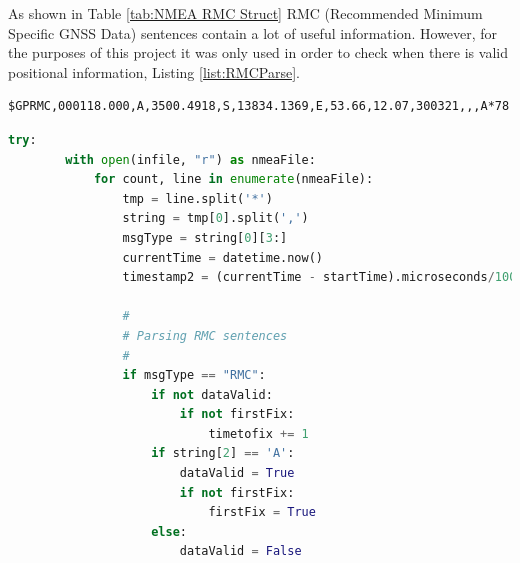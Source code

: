As shown in Table \ref{tab:NMEA RMC Struct} RMC (Recommended Minimum Specific GNSS Data) sentences contain a lot of useful information. However, for the purposes of this
project it was only used in order to check when there is valid positional information, Listing \ref{list:RMCParse}.

\begin{verbatim}
$GPRMC,000118.000,A,3500.4918,S,13834.1369,E,53.66,12.07,300321,,,A*78
\end{verbatim}

\begin{lstlisting}[language=Python, label=list:RMCParse, caption=Parsing RMC sentences for data and fix validity checks]
    try:
        with open(infile, "r") as nmeaFile:
            for count, line in enumerate(nmeaFile):
                tmp = line.split('*')
                string = tmp[0].split(',')
                msgType = string[0][3:]
                currentTime = datetime.now()
                timestamp2 = (currentTime - startTime).microseconds/1000000
    
                #
                # Parsing RMC sentences
                #
                if msgType == "RMC":
                    if not dataValid:
                        if not firstFix:
                            timetofix += 1
                    if string[2] == 'A':
                        dataValid = True
                        if not firstFix:
                            firstFix = True
                    else:
                        dataValid = False
    \end{lstlisting}


